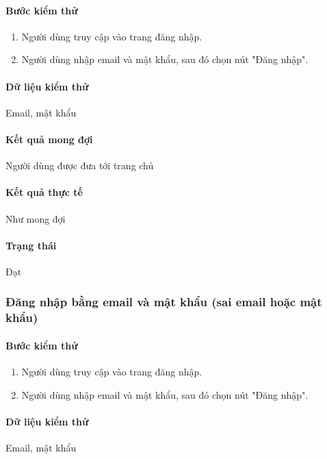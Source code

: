 \documentclass[./../main.tex]{subfiles}
\begin{document}
\paragraph*{Bước kiểm thử}

\begin{enumerate}
    \item Người dùng truy cập vào trang đăng nhập.
    \item Người dùng nhập email và mật khẩu, sau đó chọn nút "Đăng nhập".
\end{enumerate}

\paragraph*{Dữ liệu kiểm thử} Email, mật khẩu

\paragraph*{Kết quả mong đợi} Người dùng được đưa tới trang chủ

\paragraph*{Kết quả thực tế} Như mong đợi

\paragraph*{Trạng thái} Đạt

\subsubsection{Đăng nhập bằng email và mật khẩu (sai email hoặc mật khẩu)}

\paragraph*{Bước kiểm thử}

\begin{enumerate}
    \item Người dùng truy cập vào trang đăng nhập.
    \item Người dùng nhập email và mật khẩu, sau đó chọn nút "Đăng nhập".
\end{enumerate}

\paragraph*{Dữ liệu kiểm thử} Email, mật khẩu
\end{document}
